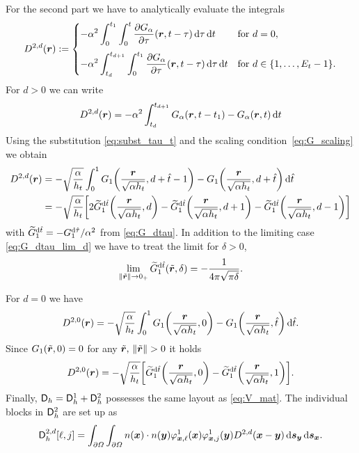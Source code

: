 \documentclass[a4paper,11pt]{article}
\begin{document}
For the second part we have to analytically evaluate the integrals
\begin{equation*}
  D^{2,d}({{\bm{r}}}) := 
  \begin{cases}
  \displaystyle
    -\alpha^2 \int_{0}^{t_1} \int_{0}^{t} \frac{\partial G_\alpha}{\partial \tau}({{\bm{r}}},t-\tau) \,{\mathrm{d}}\tau \,{\mathrm{d}} t & \text{for } d = 0, \\[4mm]
  \displaystyle
    -\alpha^2 \int_{t_d}^{t_{d+1}} \int_{0}^{t_1} \frac{\partial G_\alpha}{\partial \tau}({{\bm{r}}},t-\tau) \,{\mathrm{d}}\tau \,{\mathrm{d}} t & \text{for } d \in \{1,\ldots,E_t-1\}.
  \end{cases}
\end{equation*}
For $d>0$ we can write
\begin{equation*}
  D^{2,d}({{\bm{r}}}) = -\alpha^2 \int_{t_d}^{t_{d+1}} G_\alpha({{\bm{r}}},t-t_1) - G_\alpha({{\bm{r}}},t) \,{\mathrm{d}} t
\end{equation*}
Using the substitution \eqref{eq:subst_tau_t} and the scaling condition~\eqref{eq:G_scaling} we obtain
\begin{align*}
  D^{2,d}({{\bm{r}}}) &= -\sqrt{\frac{\alpha}{h_t}} \int_0^1 G_1\bigg(\frac{{{\bm{r}}}}{\sqrt{\alpha h_t}},d+\hat t-1\bigg) - G_1\bigg(\frac{{{\bm{r}}}}{\sqrt{\alpha h_t}},d + \hat t\bigg) \,{\mathrm{d}} \hat t \\
  &= -\sqrt{\frac{\alpha}{h_t}} \bigg[ 2\widetilde G_1^{{\mathrm{d}}\hat t}\bigg( \frac{{{\bm{r}}}}{\sqrt{\alpha h_t}}, d \bigg) - \widetilde G_1^{{\mathrm{d}}\hat t}\bigg( \frac{{{\bm{r}}}}{\sqrt{\alpha h_t}}, d + 1 \bigg) - \widetilde G_1^{{\mathrm{d}}\hat t}\bigg( \frac{{{\bm{r}}}}{\sqrt{\alpha h_t}}, d - 1 \bigg) \bigg]
\end{align*}
with $\widetilde G_1^{{\mathrm{d}}\hat t} = -G_1^{{\mathrm{d}}\hat \tau}/\alpha^2$ from \eqref{eq:G_dtau}. In addition to the limiting case \eqref{eq:G_dtau_lim_d} we have to treat the limit for $\delta>0$,
\begin{equation*}
  \lim_{\|\tilde {{{\bm{r}}}}\| \to 0_+} \widetilde G^{{\mathrm{d}}\hat t}_1(\tilde {{{\bm{r}}}},\delta) = -\frac{1}{4\pi\sqrt{\pi\delta}}.
\end{equation*}

For $d=0$ we have
\begin{equation*}
  D^{2,0}({{\bm{r}}}) = -\sqrt{\frac{\alpha}{h_t}} \int_0^1 G_1\bigg(\frac{{{\bm{r}}}}{\sqrt{\alpha h_t}},0\bigg) - G_1\bigg(\frac{{{\bm{r}}}}{\sqrt{\alpha h_t}},\hat t\bigg) \,{\mathrm{d}} \hat t.
\end{equation*}
Since $G_1(\tilde {{{\bm{r}}}},0) = 0$ for any $\tilde \vr,\,\|\tilde \vr\|>0$ it holds
\begin{equation*}
  D^{2,0}({{\bm{r}}}) = -\sqrt{\frac{\alpha}{h_t}}\bigg[ \widetilde G_1^{{\mathrm{d}}\hat t}\bigg( \frac{{{\bm{r}}}}{\sqrt{\alpha h_t}}, 0 \bigg) - \widetilde G_1^{{\mathrm{d}}\hat t}\bigg( \frac{{{\bm{r}}}}{\sqrt{\alpha h_t}}, 1 \bigg) \bigg].
\end{equation*}
Finally, ${{\mathsf{D}}}_h = {{\mathsf{D}}}_h^1 + {{\mathsf{D}}}_h^2$ possesses the same layout as \eqref{eq:V_mat}. The individual blocks in ${{\mathsf{D}}}_h^2$ are set up as
\begin{equation*}
  {\ensuremath{{\mathsf{D}}}}^{2,d}_h[ \ell , j ] = \int_{\partial\Omega} \int_{\partial\Omega} n({{\bm{x}}}) \cdot n({{\bm{y}}}) \varphi^1_{{{\bm{x}}},\ell}({{\bm{x}}}) \varphi^1_{{{\bm{x}}},j}({{\bm{y}}}) D^{2,d}({{\bm{x}}}-{{\bm{y}}}) \,{\mathrm{d}}{{\bm{s}}}_{{\bm{y}}} \,{\mathrm{d}}{{\bm{s}}}_{{\bm{x}}}.
\end{equation*}
\end{document}
